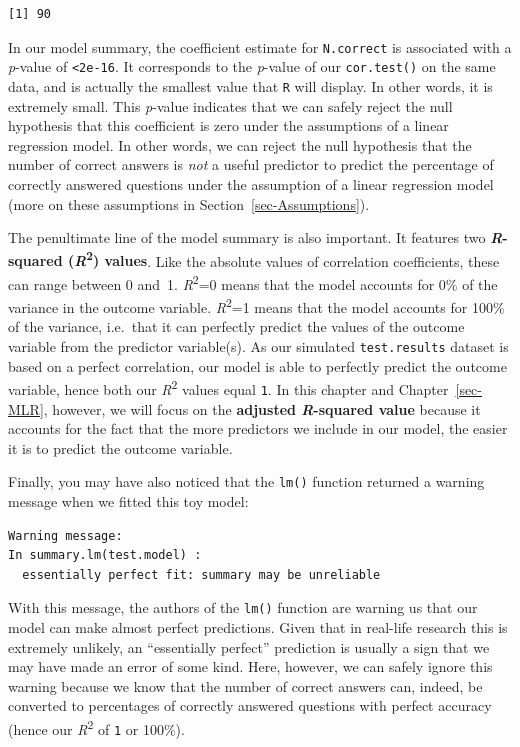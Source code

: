 \documentclass[
  letterpaper,
  DIV=11,
  numbers=noendperiod]{scrreprt}
\begin{document}
\begin{verbatim}
[1] 90
\end{verbatim}

In our model summary, the coefficient estimate for \texttt{N.correct} is
associated with a \emph{p}-value of \texttt{\textless{}2e-16}. It
corresponds to the \emph{p}-value of our \texttt{cor.test()} on the same
data, and is actually the smallest value that \texttt{R} will display.
In other words, it is extremely small. This \emph{p}-value indicates
that we can safely reject the null hypothesis that this coefficient is
zero under the assumptions of a linear regression model. In other words,
we can reject the null hypothesis that the number of correct answers is
\emph{not} a useful predictor to predict the percentage of correctly
answered questions under the assumption of a linear regression model
(more on these assumptions in Section~\ref{sec-Assumptions}).

The penultimate line of the model summary is also important. It features
two \textbf{\emph{R}-squared (\emph{R}\textsuperscript{2}) values}. Like
the absolute values of correlation coefficients, these can range between
0 and~1. \emph{R}\textsuperscript{2}=0 means that the model accounts for
0\% of the variance in the outcome variable.
\emph{R}\textsuperscript{2}=1 means that the model accounts for 100\% of
the variance, i.e.~that it can perfectly predict the values of the
outcome variable from the predictor variable(s). As our simulated
\texttt{test.results} dataset is based on a perfect correlation, our
model is able to perfectly predict the outcome variable, hence both our
\emph{R}\textsuperscript{2} values equal \texttt{1}. In this chapter and
Chapter~\ref{sec-MLR}, however, we will focus on the \textbf{adjusted
\emph{R}-squared value} because it accounts for the fact that the more
predictors we include in our model, the easier it is to predict the
outcome variable.

Finally, you may have also noticed that the \texttt{lm()} function
returned a warning message when we fitted this toy model:

\begin{verbatim}
Warning message:
In summary.lm(test.model) :
  essentially perfect fit: summary may be unreliable
\end{verbatim}

With this message, the authors of the \texttt{lm()} function are warning
us that our model can make almost perfect predictions. Given that in
real-life research this is extremely unlikely, an ``essentially
perfect'' prediction is usually a sign that we may have made an error of
some kind. Here, however, we can safely ignore this warning because we
know that the number of correct answers can, indeed, be converted to
percentages of correctly answered questions with perfect accuracy (hence
our \emph{R}\textsuperscript{2} of \texttt{1} or 100\%).
\end{document}
